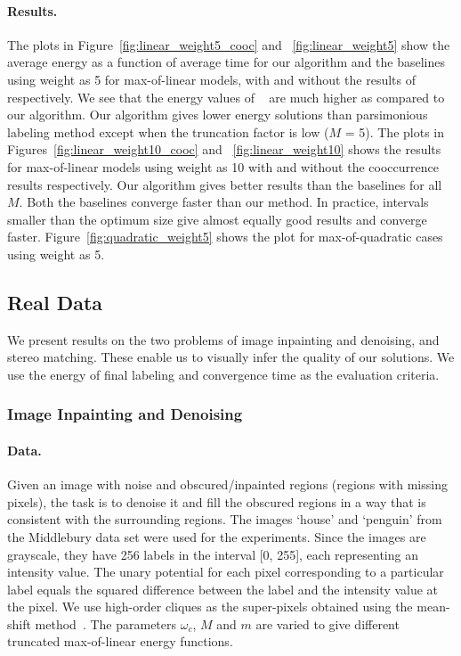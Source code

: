 \documentclass[10pt,letterpaper]{article}
\newcommand{\mysubsection}[1]{\vspace{0mm}\subsection{#1}\vspace{0mm}}
\newcommand{\mysubsubsection}[1]{\vspace{0mm}\subsubsection{#1}\vspace{0mm}}
\newcommand{\myparagraph}[1]{\vspace{0mm}\paragraph{#1}}
\begin{document}
\myparagraph{\bf Results.} The plots in Figure~\ref{fig:linear_weight5_cooc} and ~\ref{fig:linear_weight5} show the average energy as a function of average time for our algorithm and the baselines using weight as 5 for max-of-linear models, with and without the results of ~\cite{ladickyeccv10} respectively. We see that the energy values of  ~\cite{ladickyeccv10} are much higher as compared to our algorithm. Our algorithm gives lower energy solutions than parsimonious labeling method except when the truncation factor is low ($M$ = 5). The plots in Figures~\ref{fig:linear_weight10_cooc} and ~\ref{fig:linear_weight10} shows the results for max-of-linear models using weight as 10 with and without the cooccurrence results respectively. Our algorithm gives better results than the baselines for all $M$. Both the baselines converge faster than our method. In practice, intervals smaller than the optimum size give almost equally good results and converge faster. Figure~\ref{fig:quadratic_weight5} shows the plot for max-of-quadratic cases using weight as 5.

\clearpage
\mysubsection{Real Data}

We present results on the two problems of image inpainting and denoising, and stereo matching. These enable us to visually infer the quality of our solutions. We use the energy of final labeling and convergence time as the evaluation criteria. 

\mysubsubsection{Image Inpainting and Denoising}


\myparagraph{\bf Data.} Given an image with noise and obscured/inpainted regions (regions with missing pixels), the task is to denoise it and fill the obscured regions in a way that is consistent with the surrounding regions. The images `house' and `penguin' from the Middlebury data set were used for the experiments. Since the images are grayscale, they have 256 labels in the interval [0, 255], each representing an intensity value. The unary potential for each pixel corresponding to a particular label equals the squared difference between the label and the intensity value at the pixel. We use high-order cliques as the super-pixels obtained using the mean-shift method~\cite{comaniciu2002mean}. The parameters $\omega_c$, $M$ and $m$ are varied to give different truncated max-of-linear energy functions.
\end{document}
